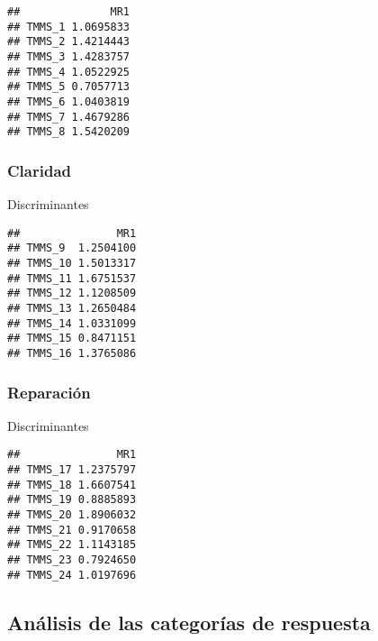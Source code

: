 \documentclass[
  10pt,
  spanish,
]{article}
\newenvironment{Shaded}{\begin{snugshade}}{\end{snugshade}}
\newcommand{\NormalTok}[1]{#1}
\newcommand{\OperatorTok}[1]{\textcolor[rgb]{0.81,0.36,0.00}{\textbf{#1}}}
\begin{document}
\begin{verbatim}
##              MR1
## TMMS_1 1.0695833
## TMMS_2 1.4214443
## TMMS_3 1.4283757
## TMMS_4 1.0522925
## TMMS_5 0.7057713
## TMMS_6 1.0403819
## TMMS_7 1.4679286
## TMMS_8 1.5420209
\end{verbatim}

\hypertarget{claridad-2}{%
\subsubsection{Claridad}\label{claridad-2}}

Discriminantes

\begin{Shaded}
\end{Shaded}

\begin{verbatim}
##               MR1
## TMMS_9  1.2504100
## TMMS_10 1.5013317
## TMMS_11 1.6751537
## TMMS_12 1.1208509
## TMMS_13 1.2650484
## TMMS_14 1.0331099
## TMMS_15 0.8471151
## TMMS_16 1.3765086
\end{verbatim}

\hypertarget{reparaciuxf3n-1}{%
\subsubsection{Reparación}\label{reparaciuxf3n-1}}

Discriminantes

\begin{Shaded}
\end{Shaded}

\begin{verbatim}
##               MR1
## TMMS_17 1.2375797
## TMMS_18 1.6607541
## TMMS_19 0.8885893
## TMMS_20 1.8906032
## TMMS_21 0.9170658
## TMMS_22 1.1143185
## TMMS_23 0.7924650
## TMMS_24 1.0197696
\end{verbatim}

\hypertarget{anuxe1lisis-de-las-categoruxedas-de-respuesta}{%
\subsection{Análisis de las categorías de
respuesta}\label{anuxe1lisis-de-las-categoruxedas-de-respuesta}}
\end{document}
